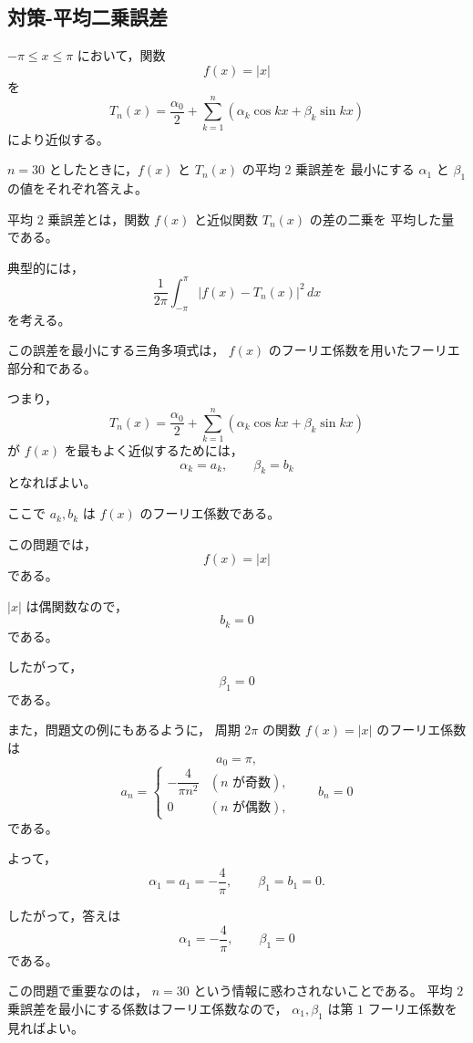 \subsection{対策-平均二乗誤差}
\begin{exercise}[平均2乗誤差とフーリエ近似]
	\(-\pi\leq x\leq \pi\) において，関数
	\[
	f(x)=|x|
	\]
	を
	\[
	T_n(x)
	=
	\frac{\alpha_0}{2}
	+
	\sum_{k=1}^{n}
	\left(
	\alpha_k\cos kx+\beta_k\sin kx
	\right)
	\]
	により近似する。
	
	\(n=30\) としたときに，\(f(x)\) と \(T_n(x)\) の平均 \(2\) 乗誤差を
	最小にする \(\alpha_1\) と \(\beta_1\) の値をそれぞれ答えよ。
\end{exercise}

\begin{background}
	平均 \(2\) 乗誤差とは，関数 \(f(x)\) と近似関数 \(T_n(x)\) の差の二乗を
	平均した量である。
	
	典型的には，
	\[
	\frac{1}{2\pi}\int_{-\pi}^{\pi}
	|f(x)-T_n(x)|^2\,dx
	\]
	を考える。
	
	この誤差を最小にする三角多項式は，
	\(f(x)\) のフーリエ係数を用いたフーリエ部分和である。
	
	つまり，
	\[
	T_n(x)
	=
	\frac{\alpha_0}{2}
	+
	\sum_{k=1}^{n}
	\left(
	\alpha_k\cos kx+\beta_k\sin kx
	\right)
	\]
	が \(f(x)\) を最もよく近似するためには，
	\[
	\alpha_k=a_k,\qquad \beta_k=b_k
	\]
	となればよい。
	
	ここで \(a_k,b_k\) は \(f(x)\) のフーリエ係数である。
\end{background}
\begin{strategy}
	この問題では，
	\[
	f(x)=|x|
	\]
	である。
	
	\(|x|\) は偶関数なので，
	\[
	b_k=0
	\]
	である。
	
	したがって，
	\[
	\beta_1=0
	\]
	である。
	
	また，問題文の例にもあるように，
	周期 \(2\pi\) の関数 \(f(x)=|x|\) のフーリエ係数は
	\[
	a_0=\pi,
	\]
	\[
	a_n=
	\begin{cases}
		-\dfrac{4}{\pi n^2} & (n\text{ が奇数}),\\[6pt]
		0 & (n\text{ が偶数}),
	\end{cases}
	\qquad
	b_n=0
	\]
	である。
	
	よって，
	\[
	\alpha_1=a_1=-\frac{4}{\pi},
	\qquad
	\beta_1=b_1=0.
	\]
	
	したがって，答えは
	\[
	\boxed{
		\alpha_1=-\frac{4}{\pi},
		\qquad
		\beta_1=0
	}
	\]
	である。
	
	この問題で重要なのは，
	\(n=30\) という情報に惑わされないことである。
	平均 \(2\) 乗誤差を最小にする係数はフーリエ係数なので，
	\(\alpha_1,\beta_1\) は第 \(1\) フーリエ係数を見ればよい。
\end{strategy}
